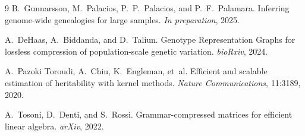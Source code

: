 \documentclass[11pt]{article}
\begin{document}
\begin{thebibliography}{9}
B.~Gunnarsson, M.~Palacios, P.~P.~Palacios, and P.~F.~Palamara.
\newblock Inferring genome-wide genealogies for large samples.
\newblock \emph{In preparation}, 2025.

A.~DeHaas, A.~Biddanda, and D.~Taliun.
\newblock Genotype Representation Graphs for lossless compression of population-scale genetic variation.
\newblock \emph{bioRxiv}, 2024.

A.~Pazoki Toroudi, A.~Chiu, K.~Engleman, et~al.
\newblock Efficient and scalable estimation of heritability with kernel methods.
\newblock \emph{Nature Communications}, 11:3189, 2020.

A.~Tosoni, D.~Denti, and S.~Rossi.
\newblock Grammar-compressed matrices for efficient linear algebra.
\newblock \emph{arXiv}, 2022.
\end{thebibliography}
\end{document}
